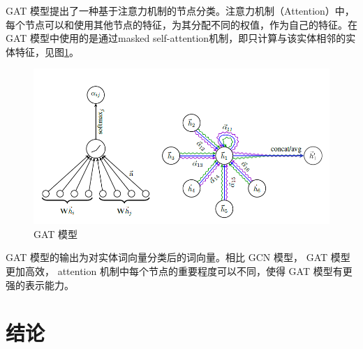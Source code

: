 \documentclass{llncs}
\begin{document}
GAT 模型\cite{DBLP:conf/iclr/VelickovicCCRLB18}提出了一种基于注意力机制的节点分类。注意力机制（Attention）\cite{DBLP:journals/corr/BahdanauCB14}中，每个节点可以和使用其他节点的特征，为其分配不同的权值，作为自己的特征。在 GAT 模型中使用的是通过masked self-attention机制，即只计算与该实体相邻的实体特征，见图\ref{fg:GAT}。
\begin{figure}
	\centering
	\includegraphics[width=0.8\columnwidth]{figures/GAT.png}
	\caption{ GAT 模型}
	\label{fg:GAT}
\end{figure}
 GAT 模型的输出为对实体词向量分类后的词向量。相比 GCN 模型\cite{DBLP:conf/iclr/KipfW17}， GAT 模型更加高效， attention 机制中每个节点的重要程度可以不同，使得 GAT 模型有更强的表示能力。

\section{结论}


%

	
\end{document}

